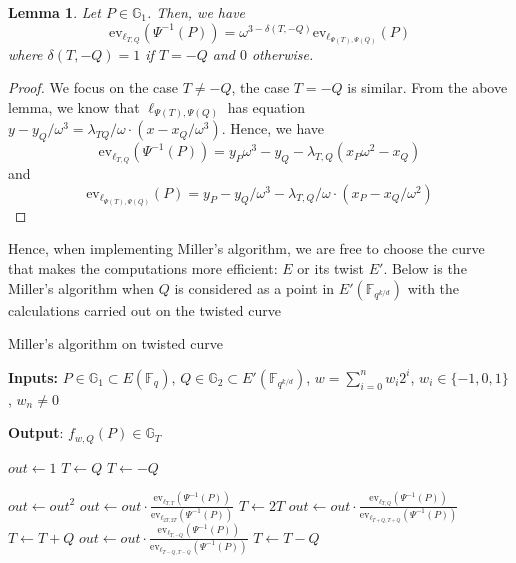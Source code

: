 \documentclass{article}
\newcommand{\gOne}{\mathbb{G}_1}
\newcommand{\gTwo}{\mathbb{G}_2}
\newcommand{\gT}{\mathbb{G}_T}
\newcommand{\ev}{\mathrm{ev}}
\newcommand{\fq}[1]{\mathbb{F}_{q^{#1}}}
\theoremstyle{remark}
\theoremstyle{plain}
\newtheorem{lemma}{Lemma}[section]
\begin{document}
\begin{lemma}
    \label{lem:relationBwBaseAndTwistedEval}
    Let $P \in \gOne$. Then, we have
    \[
        \ev_{\ell_{T,Q}}(\Psi^{-1}(P)) = \omega^{3 - \delta(T,-Q)} \ev_{\ell_{\Psi(T),\Psi(Q)}}(P)
    \]
    where $\delta(T,-Q) = 1$ if $T = -Q$ and $0$ otherwise.
\end{lemma}

\begin{proof}
    We focus on the case $T \neq -Q$, the case $T = -Q$ is similar.
    From the above lemma, we know that $\ell_{\Psi(T),\Psi(Q)}$ has equation $y - y_Q / \omega^3 = \lambda_{TQ} / \omega \cdot (x - x_Q / \omega^3)$.
    Hence, we have
    \[
        \ev_{\ell_{T,Q}}(\Psi^{-1}(P)) = y_P \omega^3 - y_Q - \lambda_{T,Q} (x_P \omega^2 - x_Q)
    \]
    and
    \[
        \ev_{\ell_{\Psi(T),\Psi(Q)}}(P) = y_P - y_Q / \omega^3 - \lambda_{T,Q} / \omega \cdot (x_P - x_Q / \omega^2)
    \]
\end{proof}

Hence, when implementing Miller's algorithm, we are free to choose the curve that makes the computations more efficient: $E$ or its twist $E'$.
Below is the Miller's algorithm when $Q$ is considered as a point in $E'(\fq{k/d})$ with the calculations carried out on the twisted curve

\begin{algorithm}
    \label{alg:millerOnTwistedCurve}
    \caption{\small Miller's algorithm on twisted curve}\label{alg:millerAlgorithWithTwistedCurve}
    \textbf{Inputs:} $P \in \gOne \subset E(\fq{})$, $Q \in \gTwo \subset E'(\fq{k/d})$, $w = \sum_{i=0}^n w_i 2^i$, $w_i \in \{-1,0,1\}$, $w_n \neq 0$

    \textbf{Output}: $f_{w,Q}(P) \in \gT$
    \begin{algorithmic}
        \State $out \gets 1$
            \State $T \gets Q$
        \Else
            \State $T \gets -Q$
        \EndIf

        \State $out \gets out^2$
        \State $out \gets out \cdot \frac{\ev_{\ell_{T,T}}(\Psi^{-1}(P))}{\ev_{\ell_{2T,2T}}(\Psi^{-1}(P))}$
        \State $T \gets 2T$
            \State $out \gets out \cdot \frac{\ev_{\ell_{T,Q}}(\Psi^{-1}(P))}{\ev_{\ell_{T+Q,T+Q}}(\Psi^{-1}(P))}$
            \State $T \gets T + Q$
        \Else
            \State $out \gets out \cdot \frac{\ev_{\ell_{T,-Q}}(\Psi^{-1}(P))}{\ev_{\ell_{T-Q,T-Q}}(\Psi^{-1}(P))}$
            \State $T \gets T - Q$
        \EndIf
        \EndFor
    \end{algorithmic}
\end{algorithm}
\end{document}
